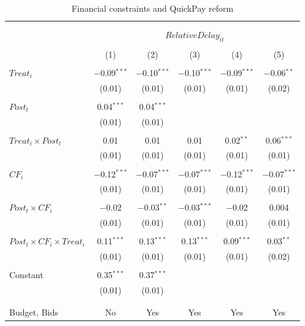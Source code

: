 \documentclass[]{article}
\begin{document}
\begin{table}[H] \centering 
  \caption{Financial constraints and QuickPay reform} 
  \label{} 
\small 
\begin{tabular}{@{\extracolsep{-2pt}}lccccc} 
\\[-1.8ex]\hline 
\hline \\[-1.8ex] 
\\[-1.8ex] & \multicolumn{5}{c}{$RelativeDelay_{it}$} \\ 
\\[-1.8ex] & (1) & (2) & (3) & (4) & (5)\\ 
\hline \\[-1.8ex] 
 $Treat_i$ & $-$0.09$^{***}$ & $-$0.10$^{***}$ & $-$0.10$^{***}$ & $-$0.09$^{***}$ & $-$0.06$^{**}$ \\ 
  & (0.01) & (0.01) & (0.01) & (0.01) & (0.02) \\ 
  & & & & & \\ 
 $Post_t$ & 0.04$^{***}$ & 0.04$^{***}$ &  &  &  \\ 
  & (0.01) & (0.01) &  &  &  \\ 
  & & & & & \\ 
 $Treat_i \times Post_t$ & 0.01 & 0.01 & 0.01 & 0.02$^{**}$ & 0.06$^{***}$ \\ 
  & (0.01) & (0.01) & (0.01) & (0.01) & (0.01) \\ 
  & & & & & \\ 
 $CF_i$ & $-$0.12$^{***}$ & $-$0.07$^{***}$ & $-$0.07$^{***}$ & $-$0.12$^{***}$ & $-$0.07$^{***}$ \\ 
  & (0.01) & (0.01) & (0.01) & (0.01) & (0.01) \\ 
  & & & & & \\ 
 $Post_t \times CF_i$ & $-$0.02 & $-$0.03$^{**}$ & $-$0.03$^{***}$ & $-$0.02 & 0.004 \\ 
  & (0.01) & (0.01) & (0.01) & (0.01) & (0.01) \\ 
  & & & & & \\ 
 $Post_t \times CF_i \times Treat_i$ & 0.11$^{***}$ & 0.13$^{***}$ & 0.13$^{***}$ & 0.09$^{***}$ & 0.03$^{**}$ \\ 
  & (0.01) & (0.01) & (0.01) & (0.01) & (0.02) \\ 
  & & & & & \\ 
 Constant & 0.35$^{***}$ & 0.37$^{***}$ &  &  &  \\ 
  & (0.01) & (0.01) &  &  &  \\ 
  & & & & & \\ 
\hline \\[-1.8ex] 
Budget, Bids & No & Yes & Yes & Yes & Yes \\ 

\end{tabular}
\end{table}
\end{document}
